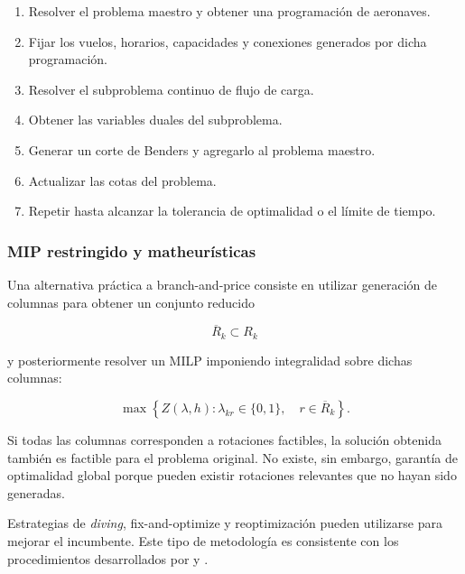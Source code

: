 \begin{enumerate}

    \item Resolver el problema maestro y obtener una programación de aeronaves.

    \item Fijar los vuelos, horarios, capacidades y conexiones generados por dicha
    programación.

    \item Resolver el subproblema continuo de flujo de carga.

    \item Obtener las variables duales del subproblema.

    \item Generar un corte de Benders y agregarlo al problema maestro.

    \item Actualizar las cotas del problema.

    \item Repetir hasta alcanzar la tolerancia de optimalidad o el límite de tiempo.

\end{enumerate}


\subsubsection{MIP restringido y matheurísticas}
\label{app:restricted_mip}

Una alternativa práctica a branch-and-price consiste en utilizar generación de columnas para
obtener un conjunto reducido

\[
\overline{R}_k\subset R_k
\]

y posteriormente resolver un MILP imponiendo integralidad sobre dichas columnas:

\begin{equation}
\max
\left\{
Z(\lambda,h):
\lambda_{kr}\in\{0,1\},
\quad
r\in\overline{R}_k
\right\}.
\label{eq:restricted_mip}
\end{equation}

Si todas las columnas corresponden a rotaciones factibles, la solución obtenida también es
factible para el problema original. No existe, sin embargo, garantía de optimalidad global
porque pueden existir rotaciones relevantes que no hayan sido generadas.

Estrategias de \textit{diving}, fix-and-optimize y reoptimización pueden utilizarse para
mejorar el incumbente. Este tipo de metodología es consistente con los procedimientos
desarrollados por  y .


